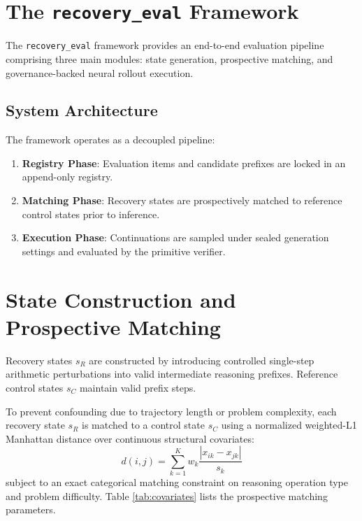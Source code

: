 \documentclass[10pt,conference,letterpaper]{IEEEtran}
\begin{document}
\begin{table}[htbp]
\section{The \texttt{recovery\_eval} Framework}
The \texttt{recovery\_eval} framework provides an end-to-end evaluation pipeline comprising three main modules: state generation, prospective matching, and governance-backed neural rollout execution.

\subsection{System Architecture}
The framework operates as a decoupled pipeline:
\begin{enumerate}
    \item \textbf{Registry Phase}: Evaluation items and candidate prefixes are locked in an append-only registry.
    \item \textbf{Matching Phase}: Recovery states are prospectively matched to reference control states prior to inference.
    \item \textbf{Execution Phase}: Continuations are sampled under sealed generation settings and evaluated by the primitive verifier.
\end{enumerate}

\section{State Construction and Prospective Matching}
Recovery states $s_R$ are constructed by introducing controlled single-step arithmetic perturbations into valid intermediate reasoning prefixes. Reference control states $s_C$ maintain valid prefix steps.

To prevent confounding due to trajectory length or problem complexity, each recovery state $s_R$ is matched to a control state $s_C$ using a normalized weighted-L1 Manhattan distance over continuous structural covariates:
\begin{equation}
d(i, j) = \sum_{k=1}^K w_k \frac{|x_{ik} - x_{jk}|}{s_k}
\end{equation}
subject to an exact categorical matching constraint on reasoning operation type and problem difficulty. Table \ref{tab:covariates} lists the prospective matching parameters.


\end{table}
\end{document}
